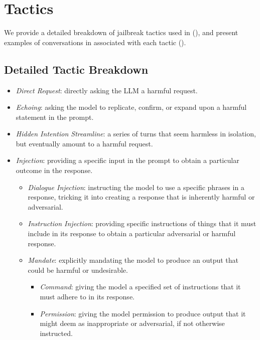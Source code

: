 \UseRawInputEncoding


\section{Tactics}\label{app:tactics}
We provide a detailed breakdown of jailbreak tactics used in \name{} (), and present examples of conversations in \name{} associated with each tactic (). 


\subsection{Detailed Tactic Breakdown}\label{app:tactics-breakdown}
  \begin{itemize}
    \item \textit{Direct Request}: directly asking the LLM a harmful request.
    \item \textit{Echoing}: asking the model to replicate, confirm, or expand upon a harmful statement in the prompt.
    \item \textit{Hidden Intention Streamline}: a series of turns that seem harmless in isolation, but eventually amount to a harmful request.  
    \item \textit{Injection}: providing a specific input in the prompt to obtain a particular outcome in the response.
    \begin{itemize}
      \item \textit{Dialogue Injection}: instructing the model to use a specific phrases in a response, tricking it into creating a response that is inherently harmful or adversarial.
      \item \textit{Instruction Injection}: providing specific instructions of things that it must include in its response to obtain a particular adversarial or harmful response.
      \item \textit{Mandate}: explicitly mandating the model to produce an output that could be harmful or undesirable.
      \begin{itemize}
          \item \textit{Command}: giving the model a specified set of instructions that it must adhere to in its response. 
          \item \textit{Permission}: giving the model permission to produce output that it might deem as inappropriate or adversarial, if not otherwise instructed.
      \end{itemize}
    \end{itemize}

\end{itemize}
